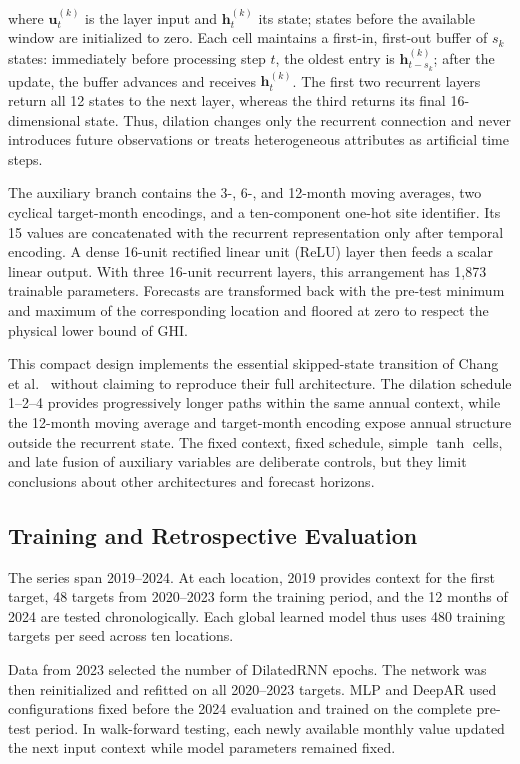 \documentclass[runningheads]{llncs}
\begin{document}
where $\mathbf u^{(k)}_t$ is the layer input and $\mathbf h^{(k)}_t$ its state; states before the available window are initialized to zero. Each cell maintains a first-in, first-out buffer of $s_k$ states: immediately before processing step $t$, the oldest entry is $\mathbf h^{(k)}_{t-s_k}$; after the update, the buffer advances and receives $\mathbf h^{(k)}_t$. The first two recurrent layers return all 12 states to the next layer, whereas the third returns its final 16-dimensional state. Thus, dilation changes only the recurrent connection and never introduces future observations or treats heterogeneous attributes as artificial time steps.

The auxiliary branch contains the 3-, 6-, and 12-month moving averages, two cyclical target-month encodings, and a ten-component one-hot site identifier. Its 15 values are concatenated with the recurrent representation only after temporal encoding. A dense 16-unit rectified linear unit (ReLU) layer then feeds a scalar linear output. With three 16-unit recurrent layers, this arrangement has 1,873 trainable parameters. Forecasts are transformed back with the pre-test minimum and maximum of the corresponding location and floored at zero to respect the physical lower bound of GHI.

This compact design implements the essential skipped-state transition of Chang et al.~\cite{chang2017} without claiming to reproduce their full architecture. The dilation schedule 1--2--4 provides progressively longer paths within the same annual context, while the 12-month moving average and target-month encoding expose annual structure outside the recurrent state. The fixed context, fixed schedule, simple $\tanh$ cells, and late fusion of auxiliary variables are deliberate controls, but they limit conclusions about other architectures and forecast horizons.

\subsection{Training and Retrospective Evaluation}

The series span 2019--2024. At each location, 2019 provides context for the first target, 48 targets from 2020--2023 form the training period, and the 12 months of 2024 are tested chronologically. Each global learned model thus uses 480 training targets per seed across ten locations.

Data from 2023 selected the number of DilatedRNN epochs. The network was then reinitialized and refitted on all 2020--2023 targets. MLP and DeepAR used configurations fixed before the 2024 evaluation and trained on the complete pre-test period. In walk-forward testing, each newly available monthly value updated the next input context while model parameters remained fixed.
\end{document}
